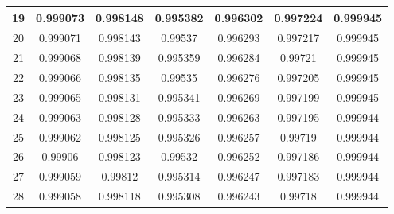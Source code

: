 \begin{table}[h]
\begin{tabular}{|l|l|l|l|l|l|l|}
\hline
\multicolumn{1}{|c|}{19} & \multicolumn{1}{c|}{0.999073} & \multicolumn{1}{c|}{0.998148} & \multicolumn{1}{c|}{0.995382} & \multicolumn{1}{c|}{0.996302} & \multicolumn{1}{c|}{0.997224} & \multicolumn{1}{c|}{0.999945} \\ 
\hline
\multicolumn{1}{|c|}{20} & \multicolumn{1}{c|}{0.999071} & \multicolumn{1}{c|}{0.998143} & \multicolumn{1}{c|}{0.99537} & \multicolumn{1}{c|}{0.996293} & \multicolumn{1}{c|}{0.997217} & \multicolumn{1}{c|}{0.999945} \\ 
\hline
\multicolumn{1}{|c|}{21} & \multicolumn{1}{c|}{0.999068} & \multicolumn{1}{c|}{0.998139} & \multicolumn{1}{c|}{0.995359} & \multicolumn{1}{c|}{0.996284} & \multicolumn{1}{c|}{0.99721} & \multicolumn{1}{c|}{0.999945} \\ 
\hline
\multicolumn{1}{|c|}{22} & \multicolumn{1}{c|}{0.999066} & \multicolumn{1}{c|}{0.998135} & \multicolumn{1}{c|}{0.99535} & \multicolumn{1}{c|}{0.996276} & \multicolumn{1}{c|}{0.997205} & \multicolumn{1}{c|}{0.999945} \\ 
\hline
\multicolumn{1}{|c|}{23} & \multicolumn{1}{c|}{0.999065} & \multicolumn{1}{c|}{0.998131} & \multicolumn{1}{c|}{0.995341} & \multicolumn{1}{c|}{0.996269} & \multicolumn{1}{c|}{0.997199} & \multicolumn{1}{c|}{0.999945} \\ 
\hline
\multicolumn{1}{|c|}{24} & \multicolumn{1}{c|}{0.999063} & \multicolumn{1}{c|}{0.998128} & \multicolumn{1}{c|}{0.995333} & \multicolumn{1}{c|}{0.996263} & \multicolumn{1}{c|}{0.997195} & \multicolumn{1}{c|}{0.999944} \\ 
\hline
\multicolumn{1}{|c|}{25} & \multicolumn{1}{c|}{0.999062} & \multicolumn{1}{c|}{0.998125} & \multicolumn{1}{c|}{0.995326} & \multicolumn{1}{c|}{0.996257} & \multicolumn{1}{c|}{0.99719} & \multicolumn{1}{c|}{0.999944} \\ 
\hline
\multicolumn{1}{|c|}{26} & \multicolumn{1}{c|}{0.99906} & \multicolumn{1}{c|}{0.998123} & \multicolumn{1}{c|}{0.99532} & \multicolumn{1}{c|}{0.996252} & \multicolumn{1}{c|}{0.997186} & \multicolumn{1}{c|}{0.999944} \\ 
\hline
\multicolumn{1}{|c|}{27} & \multicolumn{1}{c|}{0.999059} & \multicolumn{1}{c|}{0.99812} & \multicolumn{1}{c|}{0.995314} & \multicolumn{1}{c|}{0.996247} & \multicolumn{1}{c|}{0.997183} & \multicolumn{1}{c|}{0.999944} \\ 
\hline
\multicolumn{1}{|c|}{28} & \multicolumn{1}{c|}{0.999058} & \multicolumn{1}{c|}{0.998118} & \multicolumn{1}{c|}{0.995308} & \multicolumn{1}{c|}{0.996243} & \multicolumn{1}{c|}{0.99718} & \multicolumn{1}{c|}{0.999944} \\ 

\end{tabular}
\end{table}
